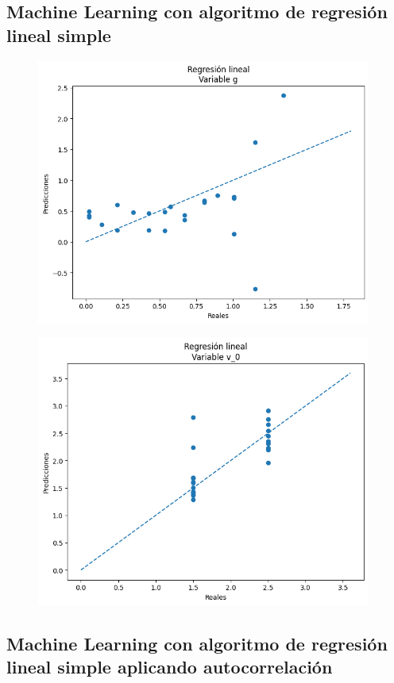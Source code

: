 \documentclass[oneside,openright,titlepage,numbers=noenddot,openany,headinclude,footinclude=true,
cleardoublepage=empty,abstractoff,BCOR=5mm,paper=a4,fontsize=12pt,main=spanish]{scrreprt}
\begin{document}
\subsection{Machine Learning con algoritmo de regresión lineal simple}

\begin{figure}[H]
	\centering
	\includegraphics[width=11cm]{Regresión lineal Variable g.png}
\end{figure}

\begin{figure}[H]
	\centering
	\includegraphics[width=11cm]{Regresión lineal Variable v_0.png}
\end{figure}

\subsection{Machine Learning con algoritmo de regresión lineal simple aplicando autocorrelación}
\end{document}
